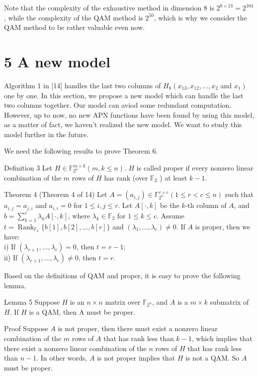 \documentclass[10pt]{article}
\begin{document}
Note that the complexity of the exhaustive method in dimension 8 is $2^{8 \times 13}=2^{104}$, while the complexity of the QAM method is $2^{50}$, which is why we consider the QAM method to be rather valuable even now.

\section*{5 A new model}
Algorithm 1 in [14] handles the last two columns of $H_{8}\left(x_{13}, x_{12}, \ldots, x_{2}\right.$ and $\left.x_{1}\right)$ one by one. In this section, we propose a new model which can handle the last two columns together. Our model can aviod some redundant computation. However, up to now, no new APN functions have been found by using this model, as a matter of fact, we haven't realized the new model. We want to study this model further in the future.

We need the following results to prove Theorem 6.

Definition 3 Let $H \in \mathbb{F}_{2^{n}}^{m \times k}(m, k \leq n)$. $H$ is called proper if every nonzero linear combination of the $m$ rows of $H$ has rank (over $\mathbb{F}_{2}$ ) at least $k-1$.

Theorem 4 (Theorem 4 of 14) Let $A=\left(a_{i, j}\right) \in \mathbb{F}_{2^{n}}^{r \times c}(1 \leq r<c \leq n)$ such that $a_{i, j}=a_{j, i}$ and $a_{i, i}=0$ for $1 \leq i, j \leq r$. Let $A[\cdot, k]$ be the $k$-th column of $A$, and $b=\sum_{k=1}^{c} \lambda_{k} A[\cdot, k]$, where $\lambda_{k} \in \mathbb{F}_{2}$ for $1 \leq k \leq c$. Assume $t=\operatorname{Rank}_{\mathbb{F}_{2}}\{b[1], b[2], \ldots, b[r]\}$ and $\left(\lambda_{1}, \ldots, \lambda_{c}\right) \neq 0$. If $A$ is proper, then we have:\\
i) If $\left(\lambda_{r+1}, \ldots, \lambda_{c}\right)=0$, then $t=r-1$;\\
ii) If $\left(\lambda_{r+1}, \ldots, \lambda_{c}\right) \neq 0$, then $t=r$.

Based on the definitions of QAM and proper, it is easy to prove the following lemma.

Lemma 5 Suppose $H$ is an $n \times n$ matrix over $\mathbb{F}_{2^{n}}$, and $A$ is a $m \times k$ submatrix of $H$. If $H$ is a QAM, then A must be proper.

Proof Suppose $A$ is not proper, then there must exist a nonzero linear combination of the $m$ rows of $A$ that has rank less than $k-1$, which implies that there exist a nonzero linear combination of the $n$ rows of $H$ that has rank less than $n-1$. In other words, $A$ is not proper implies that $H$ is not a QAM. So $A$ must be proper.
\end{document}
